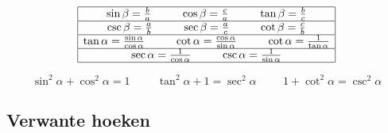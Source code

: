 \documentclass[a5paper]{article}
\begin{document}
\[
\begin{array}{|c|c|}
\hline
\text{sin} \, \beta = \frac{b}{a} \hspace{1cm} \text{cos} \, \beta = \frac{c}{a} \hspace{1cm} \text{tan} \, \beta = \frac{b}{c} \\
\hline
\text{csc} \, \beta = \frac{a}{b} \hspace{1cm} \text{sec} \, \beta = \frac{a}{c} \hspace{1cm} \text{cot} \, \beta = \frac{c}{b} \\
\hline
\text{tan} \, \alpha = \frac{\sin \alpha}{\cos \alpha} \hspace{1cm} \text{cot} \, \alpha = \frac{\cos \alpha}{\sin \alpha} \hspace{1cm} \text{cot} \, \alpha = \frac{1}{\tan \alpha} \\
\hline
\text{sec} \, \alpha = \frac{1}{\cos \alpha} \hspace{1cm} \text{csc} \, \alpha = \frac{1}{\sin \alpha}\\
\hline
\end{array}
\]

\[
\boxed{\sin^2{\alpha} + \cos^2{\alpha} = 1} \hspace{1cm}
\boxed{\tan^2{\alpha} + 1 = \sec^2{\alpha}} \hspace{1cm}
\boxed{1 + \cot^2{\alpha} = \csc^2{\alpha}}
\]

\newpage
\subsection{Verwante hoeken}
\end{document}
